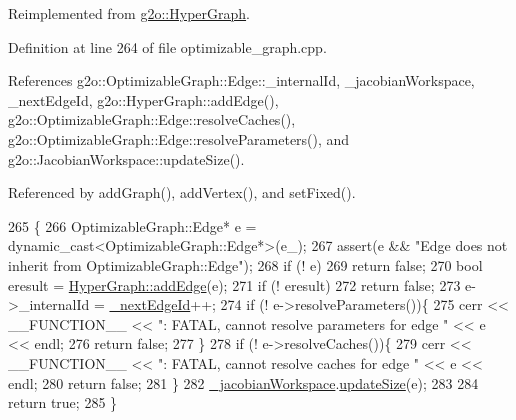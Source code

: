 Reimplemented from \hyperlink{classg2o_1_1HyperGraph_a0f1d35009a2879b238c8148c33485c89}{g2o\+::\+Hyper\+Graph}.



Definition at line 264 of file optimizable\+\_\+graph.\+cpp.



References g2o\+::\+Optimizable\+Graph\+::\+Edge\+::\+\_\+internal\+Id, \+\_\+jacobian\+Workspace, \+\_\+next\+Edge\+Id, g2o\+::\+Hyper\+Graph\+::add\+Edge(), g2o\+::\+Optimizable\+Graph\+::\+Edge\+::resolve\+Caches(), g2o\+::\+Optimizable\+Graph\+::\+Edge\+::resolve\+Parameters(), and g2o\+::\+Jacobian\+Workspace\+::update\+Size().



Referenced by add\+Graph(), add\+Vertex(), and set\+Fixed().


\begin{DoxyCode}
265   \{
266     OptimizableGraph::Edge* e = \textcolor{keyword}{dynamic\_cast<}OptimizableGraph::Edge*\textcolor{keyword}{>}(e\_);
267     assert(e && \textcolor{stringliteral}{"Edge does not inherit from OptimizableGraph::Edge"});
268     \textcolor{keywordflow}{if} (! e)
269       \textcolor{keywordflow}{return} \textcolor{keyword}{false};
270     \textcolor{keywordtype}{bool} eresult = \hyperlink{classg2o_1_1HyperGraph_a0f1d35009a2879b238c8148c33485c89}{HyperGraph::addEdge}(e);
271     \textcolor{keywordflow}{if} (! eresult)
272       \textcolor{keywordflow}{return} \textcolor{keyword}{false};
273     e->\_internalId = \hyperlink{structg2o_1_1OptimizableGraph_a93a7f05b31bca9ccaa214499f042739a}{\_nextEdgeId}++;
274     \textcolor{keywordflow}{if} (! e->resolveParameters())\{
275       cerr << \_\_FUNCTION\_\_ << \textcolor{stringliteral}{": FATAL, cannot resolve parameters for edge "} << e << endl;
276       \textcolor{keywordflow}{return} \textcolor{keyword}{false};
277     \}
278     \textcolor{keywordflow}{if} (! e->resolveCaches())\{
279       cerr << \_\_FUNCTION\_\_ << \textcolor{stringliteral}{": FATAL, cannot resolve caches for edge "} << e << endl;
280       \textcolor{keywordflow}{return} \textcolor{keyword}{false};
281     \} 
282     \hyperlink{structg2o_1_1OptimizableGraph_a161c01a29d09cca22e223ab2048eaba8}{\_jacobianWorkspace}.\hyperlink{classg2o_1_1JacobianWorkspace_a2d16ad6db1a51aa93c806cc9c06e223f}{updateSize}(e);
283 
284     \textcolor{keywordflow}{return} \textcolor{keyword}{true};
285   \}
\end{DoxyCode}
